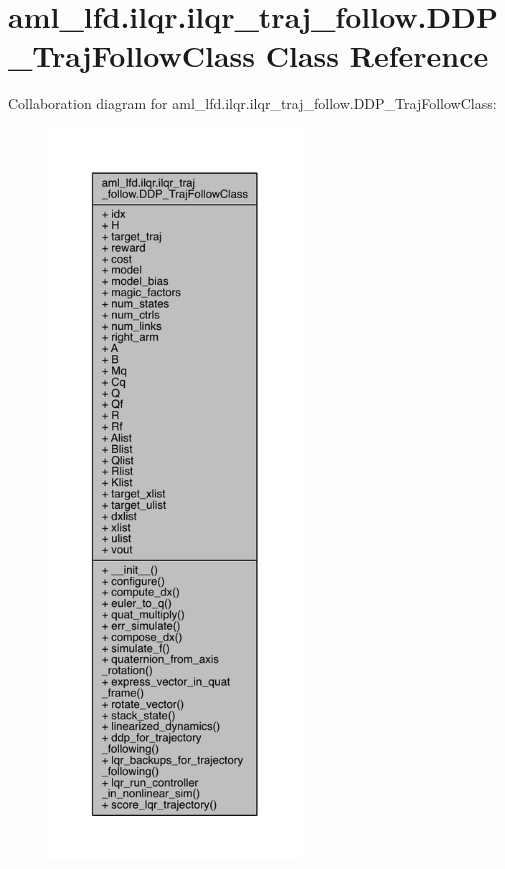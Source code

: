 \hypertarget{classaml__lfd_1_1ilqr_1_1ilqr__traj__follow_1_1_d_d_p___traj_follow_class}{}\section{aml\+\_\+lfd.\+ilqr.\+ilqr\+\_\+traj\+\_\+follow.\+D\+D\+P\+\_\+\+Traj\+Follow\+Class Class Reference}
\label{classaml__lfd_1_1ilqr_1_1ilqr__traj__follow_1_1_d_d_p___traj_follow_class}


Collaboration diagram for aml\+\_\+lfd.\+ilqr.\+ilqr\+\_\+traj\+\_\+follow.\+D\+D\+P\+\_\+\+Traj\+Follow\+Class\+:\nopagebreak
\begin{figure}[H]
\begin{center}
\leavevmode
\includegraphics[height=550pt]{classaml__lfd_1_1ilqr_1_1ilqr__traj__follow_1_1_d_d_p___traj_follow_class__coll__graph}
\end{center}
\end{figure}
